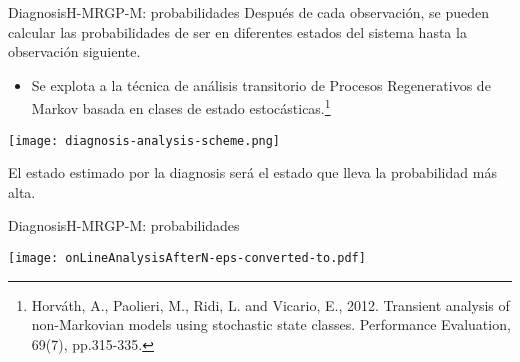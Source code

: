 \documentclass[9pt, handout]{beamer}
\begin{document}
      \begin{frame}{Diagnosis}{H-MRGP-M: probabilidades}
        Después de cada observación, se pueden calcular las probabilidades de ser en diferentes estados del sistema hasta la observación siguiente.
        \begin{itemize}
          \item Se explota a la técnica de análisis transitorio de Procesos Regenerativos de Markov basada en clases de estado estocásticas.\footnote{Horváth, A., Paolieri, M., Ridi, L. and Vicario, E., 2012. Transient analysis of non-Markovian models using stochastic state classes. Performance Evaluation, 69(7), pp.315-335.}
        \end{itemize}
        
        \begin{center}
          \texttt{[image: diagnosis-analysis-scheme.png]}
        \end{center}
        
        El estado estimado por la diagnosis será el estado que lleva la probabilidad más alta.
      \end{frame}
      
      \begin{frame}{Diagnosis}{H-MRGP-M: probabilidades}
        \begin{center}
          \texttt{[image: onLineAnalysisAfterN-eps-converted-to.pdf]}
        \end{center}
      \end{frame}
      
\end{document}
